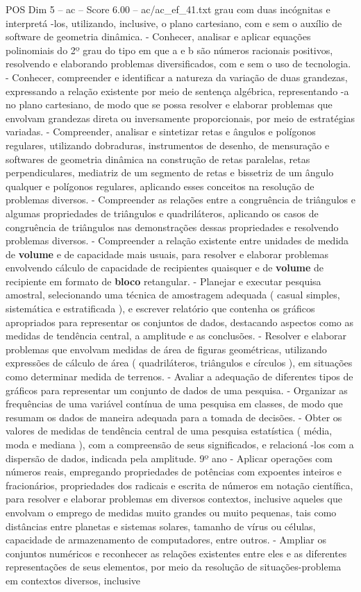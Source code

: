 \begin{textsample}{POS Dim 5 – ac – Score 6.00 – ac/ac\_ef\_41.txt}
grau com duas incógnitas e interpretá -los, utilizando, inclusive, o plano cartesiano, com e sem o auxílio de software de geometria dinâmica. - Conhecer, analisar e aplicar equações polinomiais do 2º grau do tipo em que a e b são números racionais positivos, resolvendo e elaborando problemas diversificados, com e sem o uso de tecnologia. - Conhecer, compreender e identificar a natureza da variação de duas grandezas, expressando a relação existente por meio de sentença algébrica, representando -a no plano cartesiano, de modo que se possa resolver e elaborar problemas que envolvam grandezas direta ou inversamente proporcionais, por meio de estratégias variadas. - Compreender, analisar e sintetizar retas e ângulos e polígonos regulares, utilizando dobraduras, instrumentos de desenho, de mensuração e softwares de geometria dinâmica na construção de retas paralelas, retas perpendiculares, mediatriz de um segmento de retas e bissetriz de um ângulo qualquer e polígonos regulares, aplicando esses conceitos na resolução de problemas diversos. - Compreender as relações entre a congruência de triângulos e algumas propriedades de triângulos e quadriláteros, aplicando os casos de congruência de triângulos nas demonstrações dessas propriedades e resolvendo problemas diversos. - Compreender a relação existente entre unidades de medida de \textbf{volume} e de capacidade mais usuais, para resolver e elaborar problemas envolvendo cálculo de capacidade de recipientes quaisquer e de \textbf{volume} de recipiente em formato de \textbf{bloco} retangular. - Planejar e executar pesquisa amostral, selecionando uma técnica de amostragem adequada ( casual simples, sistemática e estratificada ), e escrever relatório que contenha os gráficos apropriados para representar os conjuntos de dados, destacando aspectos como as medidas de tendência central, a amplitude e as conclusões. - Resolver e elaborar problemas que envolvam medidas de área de figuras geométricas, utilizando expressões de cálculo de área ( quadriláteros, triângulos e círculos ), em situações como determinar medida de terrenos. - Avaliar a adequação de diferentes tipos de gráficos para representar um conjunto de dados de uma pesquisa. - Organizar as frequências de uma variável contínua de uma pesquisa em classes, de modo que resumam os dados de maneira adequada para a tomada de decisões. - Obter os valores de medidas de tendência central de uma pesquisa estatística ( média, moda e mediana ), com a compreensão de seus significados, e relacioná -los com a dispersão de dados, indicada pela amplitude. 9º ano - Aplicar operações com números reais, empregando propriedades de potências com expoentes inteiros e fracionários, propriedades dos radicais e escrita de números em notação científica, para resolver e elaborar problemas em diversos contextos, inclusive aqueles que envolvam o emprego de medidas muito grandes ou muito pequenas, tais como distâncias entre planetas e sistemas solares, tamanho de vírus ou células, capacidade de armazenamento de computadores, entre outros. - Ampliar os conjuntos numéricos e reconhecer as relações existentes entre eles e as diferentes representações de seus elementos, por meio da resolução de situações-problema em contextos diversos, inclusive 
\end{textsample}

